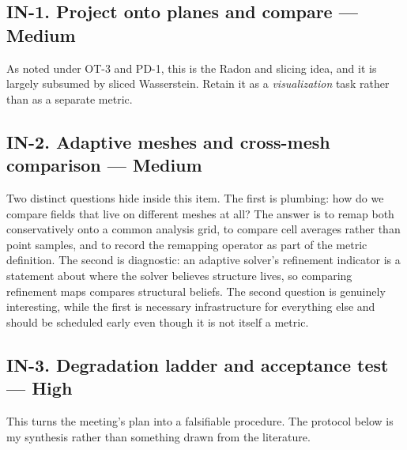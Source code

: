 \documentclass[11pt]{article}
\newcommand{\High}{\textbf{High}}
\newcommand{\Med}{Medium}
\begin{document}
\subsection{IN-1. Project onto planes and compare --- \Med{}}

As noted under OT-3 and PD-1, this is the Radon and slicing idea, and it is largely subsumed
by sliced Wasserstein. Retain it as a \emph{visualization} task rather than as a separate
metric.

\subsection{IN-2. Adaptive meshes and cross-mesh comparison --- \Med{}}

Two distinct questions hide inside this item. The first is plumbing: how do we compare fields
that live on different meshes at all? The answer is to remap both conservatively onto a
common analysis grid, to compare cell averages rather than point samples, and to record the
remapping operator as part of the metric definition. The second is diagnostic: an adaptive
solver's refinement indicator is a statement about where the solver believes structure lives,
so comparing refinement maps compares structural beliefs. The second question is genuinely
interesting, while the first is necessary infrastructure for everything else and should be
scheduled early even though it is not itself a metric.

\subsection{IN-3. Degradation ladder and acceptance test --- \High{}}

This turns the meeting's plan into a falsifiable procedure. The protocol below is my
synthesis rather than something drawn from the literature.
\end{document}
